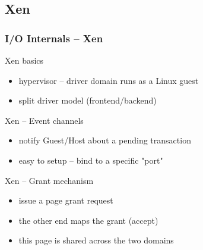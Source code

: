 \documentclass[red,slidestop,notes,compress,mathserif]{beamer}
\begin{document}
\subsection{Xen}
\begin{frame}
\frametitle{I/O Internals -- Xen}
\begin{block}{Xen basics}
                \begin{itemize}
                    \item hypervisor -- driver domain runs as a Linux guest
                    \item split driver model (frontend/backend)
                \end{itemize}
\end{block}
        \begin{block}{Xen -- Event channels}
                \begin{itemize}
                    \item notify Guest/Host about a pending transaction
                    \item easy to setup -- bind to a specific "port"
                \end{itemize}
        \end{block}
        \begin{block}{Xen -- Grant mechanism}
                \begin{itemize}
                    \item issue a page grant request
                    \item the other end maps the grant (accept)
                    \item this page is shared across the two domains
                \end{itemize}
        \end{block}

\end{frame}
\end{document}
